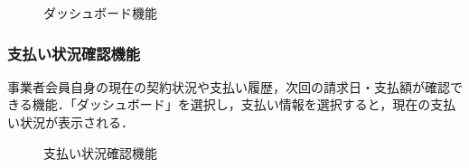 \begin{figure}[H]
    \centering
    
    \caption{ダッシュボード機能}
    \label{fig:mypage_bus3}
\end{figure}

\subsubsection{支払い状況確認機能}
事業者会員自身の現在の契約状況や支払い履歴，次回の請求日・支払額が確認できる機能．「ダッシュボード」を選択し，支払い情報を選択すると，現在の支払い状況が表示される．

\begin{figure}[H]
    \centering
    
    \caption{支払い状況確認機能}
    \label{fig:mypage_bus4}
\end{figure}